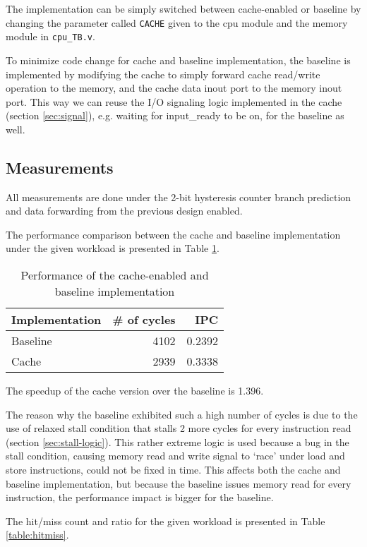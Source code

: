 \documentclass[12pt]{article}
\begin{document}
The implementation can be simply switched between cache-enabled or
baseline by changing the parameter called \verb|CACHE| given to the
cpu module and the memory module in \verb|cpu_TB.v|.

To minimize code change for cache and baseline implementation, the
baseline is implemented by modifying the cache to simply forward cache
read/write operation to the memory, and the cache data inout port to
the memory inout port.  This way we can reuse the I/O signaling logic
implemented in the cache (section \ref{sec:signal}), e.g. waiting for
input\_ready to be on, for the baseline as well.

\subsection{Measurements}

All measurements are done under the 2-bit hysteresis counter branch
prediction and data forwarding from the previous design enabled.

The performance comparison between the cache and baseline
implementation under the given workload is presented in Table
\ref{table:perf}.

\begin{table}[ht]
  \centering
  \begin{tabular}{@{}lrr@{}} \toprule
    Implementation & \# of cycles & IPC \\ \midrule
    Baseline & 4102 & 0.2392 \\
    Cache & 2939 & 0.3338 \\ \bottomrule
  \end{tabular}
  \caption{Performance of the cache-enabled and baseline implementation}
  \label{table:perf}
\end{table}

The speedup of the cache version over the baseline is 1.396.

The reason why the baseline exhibited such a high number of cycles is
due to the use of relaxed stall condition that stalls 2 more cycles
for every instruction read (section \ref{sec:stall-logic}).  This
rather extreme logic is used because a bug in the stall condition,
causing memory read and write signal to `race' under load and store
instructions, could not be fixed in time.  This affects both the cache
and baseline implementation, but because the baseline issues memory
read for every instruction, the performance impact is bigger for the
baseline.

The hit/miss count and ratio for the given workload is presented in
Table \ref{table:hitmiss}.
\end{document}
